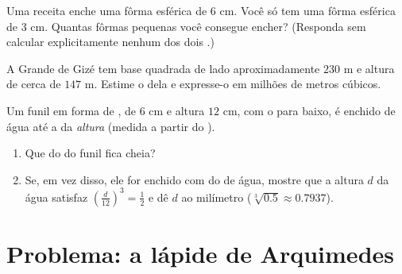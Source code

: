 \begin{exercise}[$\star\star$]\label{exo:g9:solids:7}
Uma receita enche uma fôrma esférica de  $6$ cm. Você só tem uma
fôrma esférica de  $3$ cm. Quantas fôrmas pequenas você consegue
encher? (Responda sem calcular explicitamente nenhum dos dois .)
\end{exercise}

\begin{exercise}[$\star\star$]\label{exo:g9:solids:8}
A Grande  de Gizé tem base quadrada de lado aproximadamente
$230$ m e altura de cerca de $147$ m. Estime o  dela e expresse-o
em milhões de metros cúbicos.
\end{exercise}

\begin{exercise}[$\star\star\star$]\label{exo:g9:solids:9}
Um funil em forma de , de  $6$ cm e altura $12$ cm, com o
 para baixo, é enchido de água até a  da \emph{altura}
(medida a partir do ).
\begin{enumerate}
  \item Que  do  do funil fica cheia?
  \item Se, em vez disso, ele for enchido com  do \emph{}
        de água, mostre que a altura $d$ da água satisfaz
        $\left(\frac{d}{12}\right)^3 = \frac12$ e dê $d$ ao milímetro
        ($\sqrt[3]{0.5} \approx 0.7937$).
\end{enumerate}
\end{exercise}

\section{Problema: a lápide de Arquimedes}

